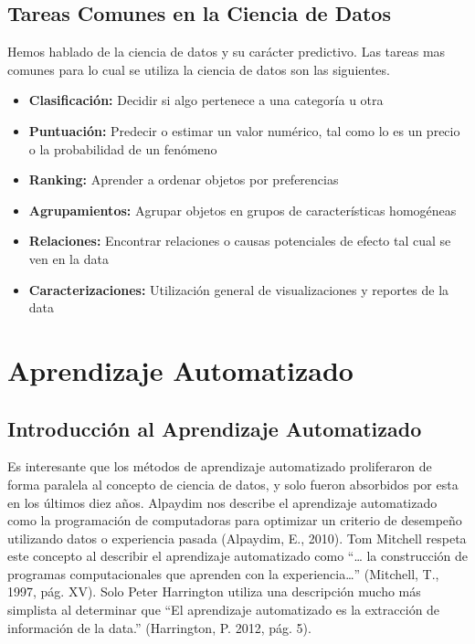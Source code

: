 \documentclass[letterpaper, spanish, 11pt]{report}
\begin{document}
\subsection{Tareas Comunes en la Ciencia de Datos}
Hemos hablado de la ciencia de datos y su carácter predictivo. Las tareas mas comunes para lo cual se utiliza la ciencia de datos son las siguientes.

\begin{itemize}
	\item \textbf{Clasificación:} Decidir si algo pertenece a una categoría u otra
	\item \textbf{Puntuación:} Predecir o estimar un valor numérico, tal como lo es un precio o la probabilidad de un fenómeno
	\item \textbf{Ranking:} Aprender a ordenar objetos por preferencias
	\item \textbf{Agrupamientos:} Agrupar objetos en grupos de características homogéneas
	\item \textbf{Relaciones:} Encontrar relaciones o causas potenciales de efecto tal cual se ven en la data
	\item \textbf{Caracterizaciones:} Utilización general de visualizaciones y reportes de la data
\end{itemize}

\section{Aprendizaje Automatizado}

\subsection{Introducción al Aprendizaje Automatizado}
Es interesante que los métodos de aprendizaje automatizado proliferaron de forma paralela al concepto de ciencia de datos, y solo fueron absorbidos por esta en los últimos diez años. Alpaydim nos describe el aprendizaje automatizado como la programación de computadoras para optimizar un criterio de desempeño utilizando datos o experiencia pasada (Alpaydim, E., 2010). Tom Mitchell respeta este concepto al describir el aprendizaje automatizado como “… la construcción de programas computacionales que aprenden con la experiencia…” (Mitchell, T., 1997, pág. XV). Solo Peter Harrington utiliza una descripción mucho más simplista al determinar que “El aprendizaje automatizado es la extracción de información de la data.” (Harrington, P. 2012, pág. 5). 
\end{document}

